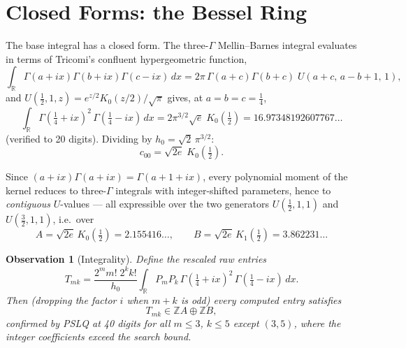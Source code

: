 \documentclass[11pt,a4paper]{article}
\theoremstyle{definition}
\theoremstyle{plain}
\newtheorem{observation}[definition]{Observation}
\newcommand{\R}{\mathbb{R}}
\newcommand{\Z}{\mathbb{Z}}
\begin{document}
\section{Closed Forms: the Bessel Ring}

The base integral has a closed form. The three-$\Gamma$ Mellin--Barnes
integral evaluates in terms of Tricomi's confluent hypergeometric
function,
\[
  \int_\R \Gamma(a+ix)\Gamma(b+ix)\Gamma(c-ix)\, dx
  = 2\pi\, \Gamma(a+c)\Gamma(b+c)\; U(a+c,\, a-b+1,\, 1),
\]
and $U(\tfrac12, 1, z) = e^{z/2} K_0(z/2)/\sqrt{\pi}$ gives, at
$a = b = c = \tfrac14$,
\[
  \int_\R \Gamma(\tfrac14+ix)^2\,\Gamma(\tfrac14-ix)\, dx
  = 2\pi^{3/2} \sqrt{e}\; K_0(\tfrac12)
  = 16.97348192607767\ldots
\]
(verified to 20 digits). Dividing by $h_0 = \sqrt2\,\pi^{3/2}$:
\[
  c_{00} = \sqrt{2e}\; K_0(\tfrac12).
\]

Since $(a+ix)\Gamma(a+ix) = \Gamma(a+1+ix)$, every polynomial moment
of the kernel reduces to three-$\Gamma$ integrals with
integer-shifted parameters, hence to \emph{contiguous} $U$-values ---
all expressible over the two generators $U(\tfrac12,1,1)$ and
$U(\tfrac32,1,1)$, i.e.\ over
\[
  A = \sqrt{2e}\, K_0(\tfrac12) = 2.155416\ldots, \qquad
  B = \sqrt{2e}\, K_1(\tfrac12) = 3.862231\ldots
\]

\begin{observation}[Integrality]\label{obs:integrality}
Define the rescaled raw entries
\[
  T_{mk} = \frac{2^m m!\; 2^k k!}{h_0}
  \int_\R P_m P_k\, \Gamma(\tfrac14+ix)^2\,\Gamma(\tfrac14-ix)\, dx.
\]
Then (dropping the factor $i$ when $m+k$ is odd) every computed entry
satisfies
\[
  T_{mk} \in \Z A \oplus \Z B,
\]
confirmed by PSLQ at 40 digits for all $m \le 3$, $k \le 5$ except
$(3,5)$, where the integer coefficients exceed the search bound.
\end{observation}
\end{document}
